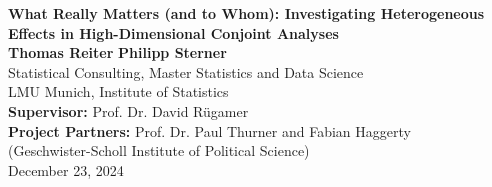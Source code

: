 \documentclass{article}
\begin{document}
\begin{titlepage}
    \thispagestyle{empty} 
    \centering
    \vspace*{1 cm}
    
    {\LARGE \textbf{What Really Matters (and to Whom): Investigating Heterogeneous Effects in High-Dimensional Conjoint Analyses}}\\[1.5 cm]
    
    {\Large \textbf{Thomas Reiter} \quad \textbf{Philipp Sterner}}\\[1 cm]
    
    {\large Statistical Consulting, Master Statistics and Data Science\\
    LMU Munich, Institute of Statistics}\\[1.5 cm]
    
    {\large \textbf{Supervisor:} Prof. Dr. David Rügamer}\\[1 cm]
    
    {\large \textbf{Project Partners:} Prof. Dr. Paul Thurner and Fabian Haggerty\\
    (Geschwister-Scholl Institute of Political Science)}\\[2 cm]
    
    {\large December 23, 2024}
    
    \vfill
\end{titlepage}
\clearpage
{}
\end{document}
